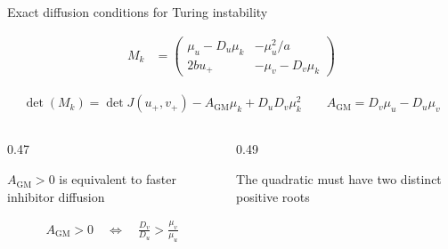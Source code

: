 \begin{frame}{Exact diffusion conditions for Turing instability}

  \vspace{-0.20cm}

  {\color{HydraWhite}\fontsize{7.9}{10.0}\selectfont
  \begin{align*}
    M_k
    &=
    \begin{pmatrix}
      \mu_u-D_u\mu_k&-\mu_u^2/a
      \\
      2bu_+&-\mu_v-D_v\mu_k
    \end{pmatrix}
  \end{align*}
  }

  \vspace{-0.38cm}

  {\color{HydraWhite}\bfseries\fontsize{8.8}{11.1}\selectfont
  \begin{align*}
    \boxed{
      \det(M_k)
      =
      \det J(u_+,v_+)
      -
      A_{\mathrm{GM}}\mu_k
      +
      D_uD_v\mu_k^2
    }
    \qquad
    A_{\mathrm{GM}}
    =
    D_v\mu_u-D_u\mu_v
  \end{align*}
  }

  \vspace{0.44cm}

  \begin{columns}[T,onlytextwidth]

    \begin{column}{0.47\textwidth}

        {$A_{\mathrm{GM}}>0$ is equivalent to faster inhibitor diffusion}

      \vspace{-0.40cm}

      {\color{HydraWhite}\bfseries\fontsize{9.2}{11.7}\selectfont
      \begin{align*}
        A_{\mathrm{GM}}>0
        \quad\Longleftrightarrow\quad
        \boxed{
          \frac{D_v}{D_u}
          >
          \frac{\mu_v}{\mu_u}
        }
      \end{align*}
      }


    \end{column}

    \begin{column}{0.49\textwidth}

        {The quadratic must have two distinct positive roots}


\end{column}
\end{columns}
\end{frame}
